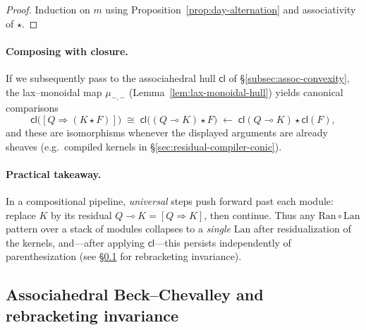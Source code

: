 \documentclass[11pt]{article}
\numberwithin{equation}{section}
\theoremstyle{upright}
\newcommand{\Lan}{\mathrm{Lan}}
\newcommand{\Ran}{\mathrm{Ran}}
\begin{document}
\begin{proof}
Induction on $m$ using Proposition~\ref{prop:day-alternation} and associativity of $\star$.
\end{proof}

\paragraph{Composing with closure.}
If we subsequently pass to the associahedral hull $\mathsf{cl}$ of \S\ref{subsec:assoc-convexity},
the lax–monoidal map $\mu_{-,-}$ (Lemma~\ref{lem:lax-monoidal-hull}) yields canonical
comparisons
\[
\mathsf{cl}\bigl([Q\Rightarrow (K\star F)]\bigr)
\;\cong\;
\mathsf{cl}\bigl((Q\multimap K)\star F\bigr)
\;\longleftarrow\;
\mathsf{cl}(Q\multimap K)\star \mathsf{cl}(F),
\]
and these are isomorphisms whenever the displayed arguments are already sheaves
(e.g.\ compiled kernels in \S\ref{sec:residual-compiler-conic}).

\paragraph{Practical takeaway.}
In a compositional pipeline, \emph{universal} steps push forward past each module:
replace $K$ by its residual $Q\multimap K=[Q\Rightarrow K]$, then continue.
Thus any $\Ran\!\circ\!\Lan$ pattern over a stack of modules collapses to a
\emph{single} $\Lan$ after residualization of the kernels, and—after applying
$\mathsf{cl}$—this persists independently of parenthesization (see
\S\ref{subsec:assoc-BC} for rebracketing invariance).

\subsection{Associahedral Beck--Chevalley and rebracketing invariance}
\label{subsec:assoc-BC}
\end{document}
